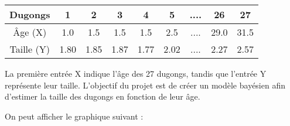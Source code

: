 \documentclass{rapportECN}
\begin{document}
\begin{center}
\begin{tabular}{|c|c|c|c|c|c|c|c|c|}
\hline
Dugongs & 1 & 2 & 3 & 4 & 5 & .... & 26 & 27 \\
\hline
Âge (X) & 1.0 & 1.5 & 1.5 & 1.5 & 2.5 & .... & 29.0 & 31.5 \\
\hline

Taille (Y) & 1.80 & 1.85  & 1.87 & 1.77 & 2.02 & .... & 2.27 & 2.57 \\
\hline
\end{tabular}
\end{center}

La première entrée X indique l'âge des 27 dugongs, tandis que l'entrée Y représente leur taille. L'objectif du projet est de créer un modèle bayésien afin d'estimer la taille des dugongs en fonction de leur âge.

On peut afficher le graphique suivant : 
\end{document}
